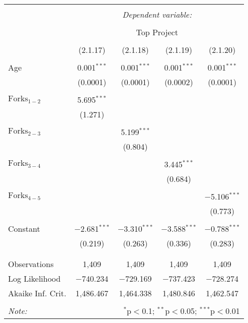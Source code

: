 
\begin{tabular}{@{\extracolsep{5pt}}lcccc}
\\[-1.8ex]\hline
\hline \\[-1.8ex]
 & \multicolumn{4}{c}{\textit{Dependent variable:}} \\
\cline{2-5}
\\[-1.8ex] & \multicolumn{4}{c}{Top Project} \\
\\[-1.8ex] & (2.1.17) & (2.1.18) & (2.1.19) & (2.1.20)\\ 
\hline \\[-1.8ex]
 Age & 0.001$^{***}$ & 0.001$^{***}$ & 0.001$^{***}$ & 0.001$^{***}$ \\
  & (0.0001) & (0.0001) & (0.0002) & (0.0001) \\
  & & & & \\
 $\text{Forks}_{1-2}$ & 5.695$^{***}$ &  &  &  \\
  & (1.271) &  &  &  \\
  & & & & \\
 $\text{Forks}_{2-3}$ &  & 5.199$^{***}$ &  &  \\
  &  & (0.804) &  &  \\
  & & & & \\
 $\text{Forks}_{3-4}$ &  &  & 3.445$^{***}$ &  \\
  &  &  & (0.684) &  \\
  & & & & \\
 $\text{Forks}_{4-5}$ &  &  &  & $-$5.106$^{***}$ \\
  &  &  &  & (0.773) \\
  & & & & \\
 Constant & $-$2.681$^{***}$ & $-$3.310$^{***}$ & $-$3.588$^{***}$ & $-$0.788$^{***}$ \\
  & (0.219) & (0.263) & (0.336) & (0.283) \\
  & & & & \\
\hline \\[-1.8ex]
Observations & 1,409 & 1,409 & 1,409 & 1,409 \\
Log Likelihood & $-$740.234 & $-$729.169 & $-$737.423 & $-$728.274 \\
Akaike Inf. Crit. & 1,486.467 & 1,464.338 & 1,480.846 & 1,462.547 \\
\hline
\hline \\[-1.8ex]
\textit{Note:}  & \multicolumn{4}{r}{$^{*}$p$<$0.1; $^{**}$p$<$0.05; $^{***}$p$<$0.01} \\
\end{tabular}
